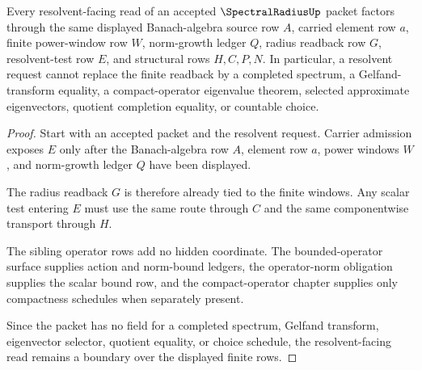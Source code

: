 \begin{theorem}
\label{thm:spectral-radius-resolvent-boundary}
Every resolvent-facing read of an accepted $\SpectralRadiusUp$ packet factors through the same displayed Banach-algebra source row $A$, carried element row $a$, finite power-window row $W$, norm-growth ledger $Q$, radius readback row $G$, resolvent-test row $E$, and structural rows $H,C,P,N$. In particular, a resolvent request cannot replace the finite readback by a completed spectrum, a Gelfand-transform equality, a compact-operator eigenvalue theorem, selected approximate eigenvectors, quotient completion equality, or countable choice.
\end{theorem}
\begin{proof}
Start with an accepted packet and the resolvent request. Carrier admission exposes $E$ only after the Banach-algebra row $A$, element row $a$, power windows $W$, and norm-growth ledger $Q$ have been displayed.

The radius readback $G$ is therefore already tied to the finite windows. Any scalar test entering $E$ must use the same route through $C$ and the same componentwise transport through $H$.

The sibling operator rows add no hidden coordinate. The bounded-operator surface supplies action and norm-bound ledgers, the operator-norm obligation supplies the scalar bound row, and the compact-operator chapter supplies only compactness schedules when separately present.

Since the packet has no field for a completed spectrum, Gelfand transform, eigenvector selector, quotient equality, or choice schedule, the resolvent-facing read remains a boundary over the displayed finite rows.
\end{proof}



